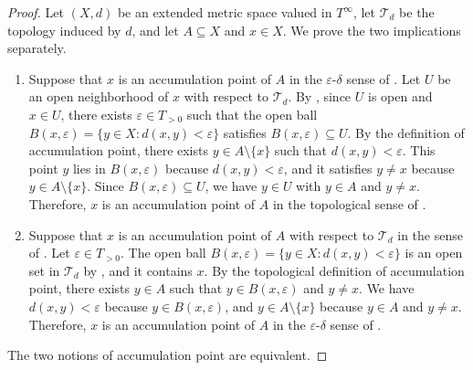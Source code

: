 \begin{proof}
    Let $(X,d)$ be an extended metric space valued in $T^\infty$, let $\mathcal{T}_d$ be the topology induced by $d$, and let $A \subseteq X$ and $x \in X$. We prove the two implications separately.

    \begin{enumerate}
        \item[$(\Rightarrow)$] Suppose that $x$ is an accumulation point of $A$ in the $\varepsilon$-$\delta$ sense of . Let $U$ be an open neighborhood of $x$ with respect to $\mathcal{T}_d$. By , since $U$ is open and $x \in U$, there exists $\varepsilon \in T_{>0}$ such that the open ball $B(x,\varepsilon) = \{y \in X : d(x,y) < \varepsilon\}$ satisfies $B(x,\varepsilon) \subseteq U$. By the definition of accumulation point, there exists $y \in A \setminus \{x\}$ such that $d(x,y) < \varepsilon$. This point $y$ lies in $B(x,\varepsilon)$ because $d(x,y) < \varepsilon$, and it satisfies $y \neq x$ because $y \in A \setminus \{x\}$. Since $B(x,\varepsilon) \subseteq U$, we have $y \in U$ with $y \in A$ and $y \neq x$. Therefore, $x$ is an accumulation point of $A$ in the topological sense of .

        \item[$(\Leftarrow)$] Suppose that $x$ is an accumulation point of $A$ with respect to $\mathcal{T}_d$ in the sense of . Let $\varepsilon \in T_{>0}$. The open ball $B(x,\varepsilon) = \{y \in X : d(x,y) < \varepsilon\}$ is an open set in $\mathcal{T}_d$ by , and it contains $x$. By the topological definition of accumulation point, there exists $y \in A$ such that $y \in B(x,\varepsilon)$ and $y \neq x$. We have $d(x,y) < \varepsilon$ because $y \in B(x,\varepsilon)$, and $y \in A \setminus \{x\}$ because $y \in A$ and $y \neq x$. Therefore, $x$ is an accumulation point of $A$ in the $\varepsilon$-$\delta$ sense of .
    \end{enumerate}

    The two notions of accumulation point are equivalent.
\end{proof}
